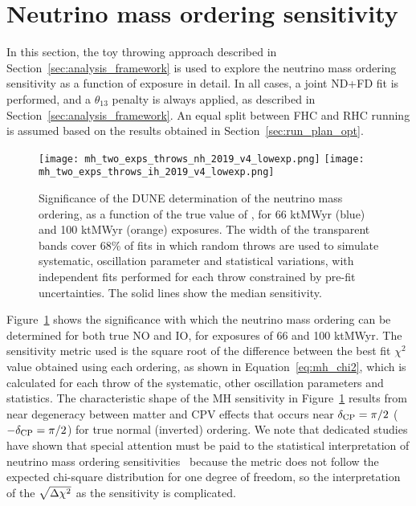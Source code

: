 \section{Neutrino mass ordering sensitivity}
\label{sec:mh_sens}

In this section, the toy throwing approach described in Section~\ref{sec:analysis_framework} is used to explore the neutrino mass ordering sensitivity as a function of exposure in detail. In all cases, a joint ND+FD fit is performed, and a $\theta_{13}$ penalty is always applied, as described in Section~\ref{sec:analysis_framework}. An equal split between FHC and RHC running is assumed based on the results obtained in Section~\ref{sec:run_plan_opt}.

\begin{figure}[htbp]
  \centering
  \texttt{[image: mh\_two\_exps\_throws\_nh\_2019\_v4\_lowexp.png]}
  \texttt{[image: mh\_two\_exps\_throws\_ih\_2019\_v4\_lowexp.png]}
  \caption{Significance of the DUNE determination of the neutrino mass ordering, as a function of the true value of \deltacp, for 66 ktMWyr (blue) and 100 ktMWyr (orange) exposures. The width of the transparent bands cover 68\% of fits in which random throws are used to simulate systematic, oscillation parameter and statistical variations, with independent fits performed for each throw constrained by pre-fit uncertainties. The solid lines show the median sensitivity.}
  \label{fig:mh_bands}
\end{figure}
Figure~\ref{fig:mh_bands} shows the significance with which the neutrino mass ordering can be determined for both true NO and IO, for exposures of 66 and 100 ktMWyr. The sensitivity metric used is the square root of the difference between the best fit $\chi^{2}$ value obtained using each ordering, as shown in Equation~\ref{eq:mh_chi2}, which is calculated for each throw of the systematic, other oscillation parameters and statistics. The characteristic shape of the MH sensitivity in Figure~\ref{fig:mh_bands} results from near degeneracy between matter and CPV effects that occurs near $\delta_{\rm CP}=\pi/2$ ($-\delta_{\rm CP}=\pi/2$) for true normal (inverted) ordering. We note that dedicated studies have shown that special attention must be paid to the statistical interpretation of neutrino mass ordering sensitivities~\cite{Ciuffoli:2013rza,Qian:2012zn,Blennow:2013oma} because the \dchisq metric does not follow the expected chi-square distribution for one degree of freedom, so the interpretation of the $\sqrt{\Delta\chi^{2}}$ as the sensitivity is complicated.

